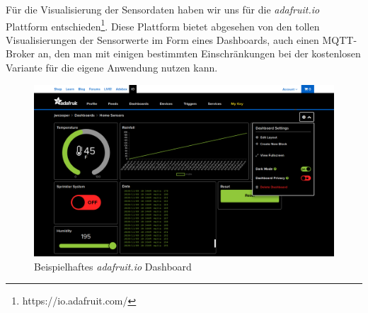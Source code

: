 Für die Visualisierung der Sensordaten haben wir uns für die \textit{adafruit.io} Plattform entschieden\footnote{https://io.adafruit.com/}. Diese Plattform bietet abgesehen von den tollen Visualisierungen der Sensorwerte im Form eines Dashboards, auch einen MQTT-Broker an, den man mit einigen bestimmten Einschränkungen bei der kostenlosen Variante für die eigene Anwendung nutzen kann. 

\begin{figure}[h]
	 \centering
	 \includegraphics[width=1.1\textwidth]{pictures/adafruitdashboard}
	 \caption[Beispielhaftes Adafruit Dashboard]{Beispielhaftes \textit{adafruit.io} Dashboard\cite{adafruitdash}}
	 \label{fig:adafruitdashboard}
\end{figure}

